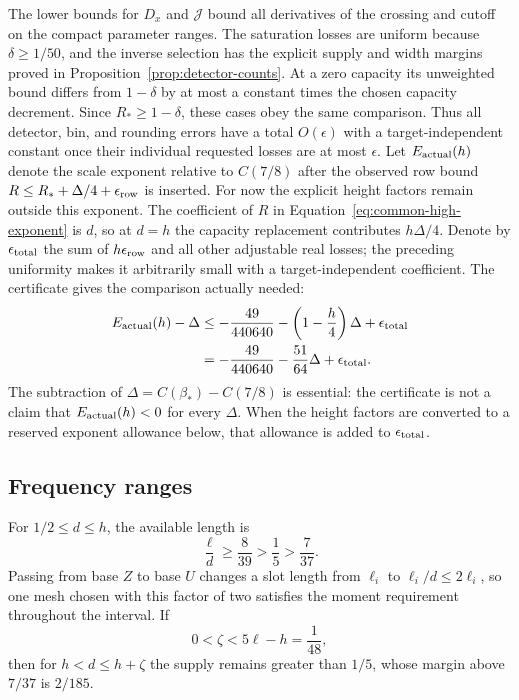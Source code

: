 The lower bounds for \(D_x\) and \(\mathcal J\) bound all derivatives
of the crossing and cutoff on the compact parameter ranges.
The saturation losses are uniform because \(\delta\ge1/50\),
and the inverse selection has the explicit supply and width margins
proved in Proposition~\ref{prop:detector-counts}.  At a zero
capacity its unweighted bound differs from \(1-\delta\) by at
most a constant times the chosen capacity decrement.  Since
\(R_*\ge1-\delta\), these cases obey the same comparison.
Thus all detector, bin, and rounding errors have a total
\(O(\epsilon)\) with a target-independent constant once their
individual requested losses are at most \(\epsilon\).
Let \(E_{\rm actual}(h)\) denote the scale exponent relative to
\(C(7/8)\) after the observed row bound
\(R\le R_*+\Delta/4+\epsilon_{\rm row}\) is inserted.
For now the explicit height factors remain outside this exponent.
The coefficient of \(R\) in Equation~\eqref{eq:common-high-exponent}
is \(d\), so at \(d=h\) the capacity replacement contributes
\(h\Delta/4\).  Denote by \(\epsilon_{\rm total}\) the sum of
\(h\epsilon_{\rm row}\) and all other adjustable real losses; the
preceding uniformity makes it arbitrarily small with a
target-independent coefficient.  The certificate gives the
comparison actually needed:
\begin{equation}
 \begin{split}
 E_{\rm actual}(h)-\Delta
 &\le-\frac{49}{440640}-\left(1-\frac h4\right)\Delta
       +\epsilon_{\rm total}\\
 &=-\frac{49}{440640}-\frac{51}{64}\Delta
       +\epsilon_{\rm total}.
 \end{split}
 \label{eq:adaptive-endpoint}
\end{equation}
The subtraction of \(\Delta=C(\beta_*)-C(7/8)\) is essential:
the certificate is not a claim that \(E_{\rm actual}(h)<0\) for
every \(\Delta\).  When the height factors are converted to a
reserved exponent allowance below, that allowance is added to
\(\epsilon_{\rm total}\).

\subsection{Frequency ranges}

For \(1/2\le d\le h\), the available length is
\[
 \frac{\ell}{d}\ge\frac8{39}>\frac15>\frac7{37}.
\]
Passing from base \(Z\) to base \(U\) changes a slot length from
\(\ell_i\) to \(\ell_i/d\le2\ell_i\), so one mesh chosen with
this factor of two satisfies the moment requirement throughout the
interval.  If
\[
 0<\zeta<5\ell-h=\frac1{48},
\]
then for \(h<d\le h+\zeta\) the supply remains greater than
\(1/5\), whose margin above \(7/37\) is \(2/185\).

